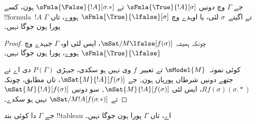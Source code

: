 \documentclass[../../../include/open-logic-section]{subfiles}
\begin{document}
\begin{prop}
  جے $\Gamma$ وچ دونیں $\sFmla{\True}{!A}[\sigma]$ تے
  $\sFmla{\False}{!A}[\sigma.{*}]$ ہون، کسے !!{formula}~$!A$ تے اگیتے~$\sigma$ لئی،
  یا اوہدے وچ $\sFmla{\True}{\lfalse}[\sigma]$ ہووے، تاں $\Gamma$ پورا ہون جوگا نہیں۔
\end{prop}

\begin{proof}
  چونکہ ہمیشہ $\mSat/{M}{\lfalse}[f(\sigma)]$، ایس لئی اوہ $\Gamma$
  جیہدے وچ $\sFmla{\True}{\lfalse}$ ہووے، پورا ہون جوگا نہیں۔

  کوئی نمونہ~$\mModel{M}$ تے تعبیر~$f$ وی نہیں ہو سکدی، جیہڑی $P(\Gamma)$ دی اے تے
  جتھے دونیں شرطاں پوریاں ہون۔ جے $\mSat{M}{!A}[f(\sigma)]$، تاں
   مطابق، چونکہ $Rf(\sigma)(\sigma.{*})$،
  ایس لئی $\mSat{M}{!A}[f(\sigma)]$۔ سو دونیں
  $\mSat{M}{!A}[f(\sigma)]$ تے $\mSat/{M}{!A}[f(\sigma.{*})]$ نہیں ہو سکدے۔
\end{proof}

\begin{thm}
  جے $\Gamma$ دا کوئی بند !!{tableau} اے، تاں $\Gamma$ پورا ہون جوگا نہیں۔
\end{thm}
\end{document}
